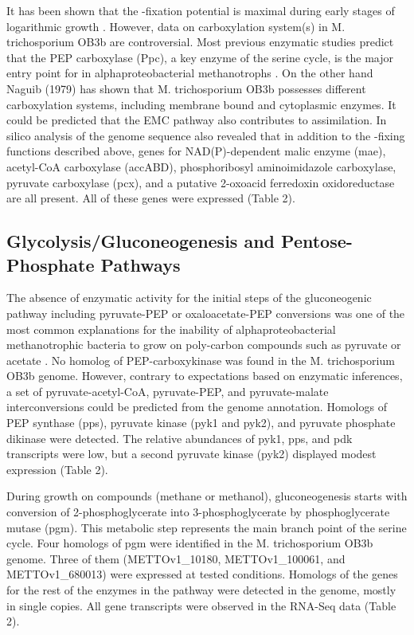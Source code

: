 It has been shown that the -fixation potential is maximal during early stages of logarithmic growth \cite{park1991, park1992}.
However, data on carboxylation system(s) in M. trichosporium OB3b are controversial.
Most previous enzymatic studies predict that the PEP carboxylase (Ppc), a key enzyme of the serine cycle, is the major entry point for  in alphaproteobacterial methanotrophs \cite{shishkina1982}.
On the other hand Naguib (1979) has shown that M. trichosporium OB3b possesses different carboxylation systems, including membrane bound and cytoplasmic enzymes.
It could be predicted that the EMC pathway also contributes to  assimilation.
In silico analysis of the genome sequence also revealed that in addition to the -fixing functions described above, genes for NAD(P)-dependent malic enzyme (mae), acetyl-CoA carboxylase (accABD), phosphoribosyl aminoimidazole carboxylase, pyruvate carboxylase (pcx), and a putative 2-oxoacid ferredoxin oxidoreductase are all present.
All of these genes were expressed (Table 2).

\subsection{Glycolysis/Gluconeogenesis and Pentose-Phosphate Pathways}
The absence of enzymatic activity for the initial steps of the gluconeogenic pathway including pyruvate-PEP or oxaloacetate-PEP conversions was one of the most common explanations for the inability of alphaproteobacterial methanotrophic bacteria to grow on poly-carbon compounds such as pyruvate or acetate \cite{patel1979, shishkina1982}.
No homolog of PEP-carboxykinase was found in the M. trichosporium OB3b genome.
However, contrary to expectations based on enzymatic inferences, a set of pyruvate-acetyl-CoA, pyruvate-PEP, and pyruvate-malate interconversions could be predicted from the genome annotation.
Homologs of PEP synthase (pps), pyruvate kinase (pyk1 and pyk2), and pyruvate phosphate dikinase were detected.
The relative abundances of pyk1, pps, and pdk transcripts were low, but a second pyruvate kinase (pyk2) displayed modest expression (Table 2).

During growth on  compounds (methane or methanol), gluconeogenesis starts with conversion of 2-phosphoglycerate into 3-phosphoglycerate by phosphoglycerate mutase (pgm).
This metabolic step represents the main branch point of the serine cycle.
Four homologs of pgm were identified in the M. trichosporium OB3b genome.
Three of them (METTOv1\_10180, METTOv1\_100061, and METTOv1\_680013) were expressed at tested conditions.
Homologs of the genes for the rest of the enzymes in the pathway were detected in the genome, mostly in single copies.
All gene transcripts were observed in the RNA-Seq data (Table 2).


